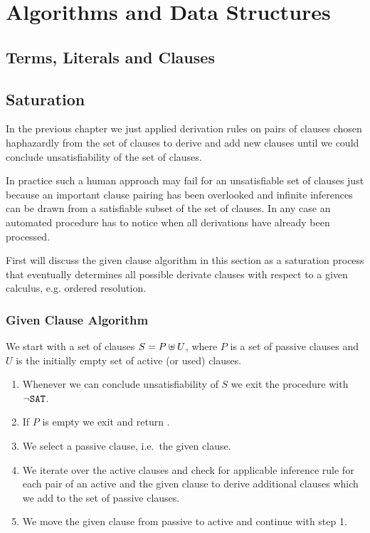 
\chapter{Algorithms and Data Structures}

\section{Terms, Literals and Clauses}


\section{Saturation}

In the previous chapter we just applied derivation rules
on pairs of clauses chosen haphazardly from the set of clauses 
to derive and add new clauses 
until we could conclude unsatisfiability of the set of clauses.

In practice such a human approach may fail for an unsatisfiable set of clauses 
just because an important clause pairing has been overlooked 
and infinite inferences can be drawn from a satisfiable subset of the set of clauses.
In any case an automated procedure has to notice when all derivations have already been processed.

First will discuss the given clause algorithm in this section
as a saturation process that eventually determines all possible derivate clauses
with respect to a given calculus, e.g. ordered resolution.

\subsection{Given Clause Algorithm}

\begin{procedure}
	We start with a set of clauses $S = P \uplus U$, 
	where $P$ is a set of {\myem passive} clauses 
	and $U$ is the initially empty set of {\myem active} (or used) clauses.
	\begin{enumerate}
		\item[\jek] Whenever we can conclude unsatisfiability of $S$ 
		we exit the procedure with $\lnot\texttt{SAT}$.
		\setcounter{enumi}{0}
		\item If $P$ is empty we exit and return \SAT.
		\item We select a passive clause, i.e.~the given clause. \jek
		\item We iterate over the active clauses and check for applicable inference rule
		for each pair of an active and the given clause
		to derive additional clauses which we add to the set of passive clauses. \jek
		\item We move the given clause from passive to active and continue with step 1.
	\end{enumerate}
\end{procedure}


